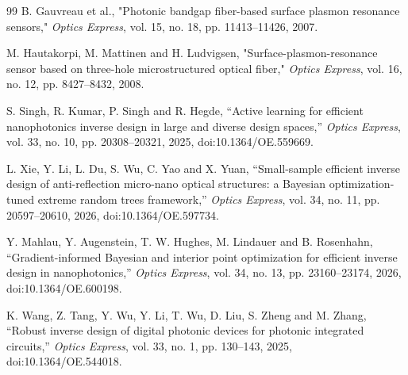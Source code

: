 \documentclass[5p,times,twocolumn]{elsarticle}
\begin{document}
\begin{thebibliography}{99}
 B. Gauvreau et al., "Photonic bandgap fiber-based surface plasmon resonance sensors," \textit{Optics Express}, vol. 15, no. 18, pp. 11413--11426, 2007.

 M. Hautakorpi, M. Mattinen and H. Ludvigsen, "Surface-plasmon-resonance sensor based on three-hole microstructured optical fiber," \textit{Optics Express}, vol. 16, no. 12, pp. 8427--8432, 2008.


 S. Singh, R. Kumar, P. Singh and R. Hegde, ``Active learning for efficient nanophotonics inverse design in large and diverse design spaces,'' \textit{Optics Express}, vol. 33, no. 10, pp. 20308--20321, 2025, doi:10.1364/OE.559669.

 L. Xie, Y. Li, L. Du, S. Wu, C. Yao and X. Yuan, ``Small-sample efficient inverse design of anti-reflection micro-nano optical structures: a Bayesian optimization-tuned extreme random trees framework,'' \textit{Optics Express}, vol. 34, no. 11, pp. 20597--20610, 2026, doi:10.1364/OE.597734.

 Y. Mahlau, Y. Augenstein, T. W. Hughes, M. Lindauer and B. Rosenhahn, ``Gradient-informed Bayesian and interior point optimization for efficient inverse design in nanophotonics,'' \textit{Optics Express}, vol. 34, no. 13, pp. 23160--23174, 2026, doi:10.1364/OE.600198.

 K. Wang, Z. Tang, Y. Wu, Y. Li, T. Wu, D. Liu, S. Zheng and M. Zhang, ``Robust inverse design of digital photonic devices for photonic integrated circuits,'' \textit{Optics Express}, vol. 33, no. 1, pp. 130--143, 2025, doi:10.1364/OE.544018.

\end{thebibliography}
\end{document}
